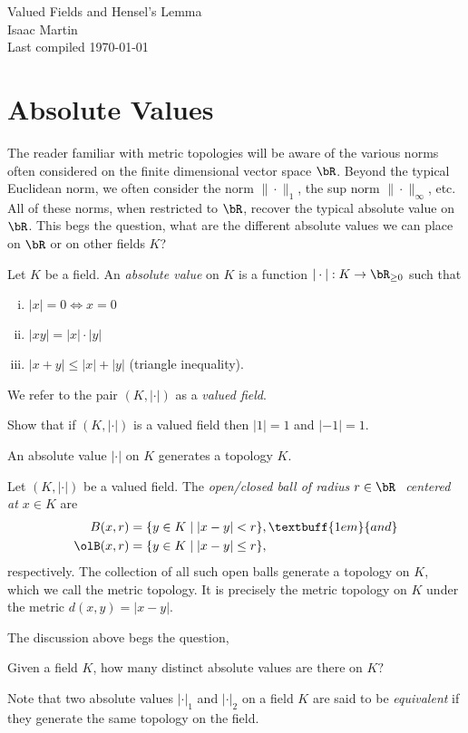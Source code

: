 


\pagestyle{empty}
	\LARGE
\begin{center}
	Valued Fields and Hensel's Lemma\\
	\Large
	Isaac Martin \\
    Last compiled \today
\end{center}
\normalsize
\vspace{-2mm}
\hru
\section{Absolute Values}
The reader familiar with metric topologies will be aware of the various norms often considered on the finite dimensional vector space $\bR$. Beyond the typical Euclidean norm, we often consider the norm $\|\cdot\|_1$, the sup norm $\|\cdot\|_\infty$, etc. All of these norms, when restricted to $\bR$, recover the typical absolute value on $\bR$. This begs the question, what are the different absolute values we can place on $\bR$ or on other fields $K$? 
\begin{defn}\label{defn:absolute-value}
	Let $K$ be a field. An \emph{absolute value} on $K$ is a function $|\cdot|:K\to \bR_{\geq 0}$ such that
	\begin{enumerate}[(i)]
		\item $|x| = 0 \iff x = 0$
		\item $|xy| = |x|\cdot|y|$
		\item $|x+y| \leq |x|+|y|$ \hspace{1em} (triangle inequality).
	\end{enumerate}
	We refer to the pair $(K,|\cdot|)$ as a \emph{valued field}.
\end{defn}
\begin{exercise}[Quick]\label{exercise:abs-val-one}
	Show that if $(K,|\cdot|)$ is a valued field then $|1| = 1$ and $|-1| = 1$.
\end{exercise}
An absolute value $|\cdot|$ on $K$ generates a topology $K$.
\begin{defn}\label{defn:abs-value-topology}
	Let $(K,|\cdot|)$ be a valued field. The \emph{open/closed ball of radius $r\in \bR~$ centered at $x \in K$} are
	\begin{align*}
		B(x,r) &= \{y \in K \mid |x - y| < r\}, \textbuff{1em}{and}\\
		\olB(x,r) &= \{y \in K \mid |x - y| \leq r\}, \hspace{1em}
	\end{align*}
	respectively. The collection of all such open balls generate a topology on $K$, which we call the metric topology. It is precisely the metric topology on $K$ under the metric $d(x,y) = |x - y|$.
\end{defn}
The discussion above begs the question,
\begin{question}\label{q:how-many-absolute-values}
	Given a field $K$, how many distinct absolute values are there on $K?$
\end{question}
Note that two absolute values $|\cdot|_1$ and $|\cdot|_2$ on a field $K$ are said to be \emph{equivalent} if they generate the same topology on the field.

